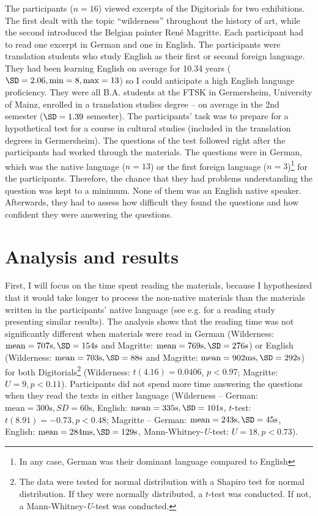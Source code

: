 \documentclass[output=paper]{langscibook}
\begin{document}
The participants ($n=16$) viewed excerpts of the Digitorials for two exhibitions. The first dealt with the topic “wilderness” throughout the history of art, while the second introduced the Belgian painter René Magritte. Each participant had to read one excerpt in German and one in English. The participants were translation students who study English as their first or second foreign language. They had been learning English on average for 10.34 years ($\SD= 2.06, \min= 8, \max= 13$) so I could anticipate a high English language proficiency. They were all B.A. students at the FTSK in Germersheim, University of Mainz, enrolled in a translation studies degree -- on average in the 2nd semester ($\SD= 1.39$ semester). The participants’ task was to prepare for a hypothetical test for a course in cultural studies (included in the translation degrees in Germersheim). The questions of the test followed right after the participants had worked through the materials. The questions were in German, which was the native language ($n=13$) or the first foreign language ($n= 3$)\footnote{In any case, German was their dominant language compared to English} for the participants. Therefore, the chance that they had problems understanding the question was kept to a minimum. None of them was an English native speaker. Afterwards, they had to assess how difficult they found the questions and how confident they were answering the questions.

\section{Analysis and results}

First, I will focus on the time spent reading the materials, because I hypothesized that it would take longer to process the non-native materials than the materials written in the participants' native language (see e.g. \citealt{cop_2015_eye} for a reading study presenting similar results). The analysis shows that the reading time was not significantly different when materials were read in German (Wilderness: $\text{mean}= 707\text{s}, \SD= 154\text{s}$ and Magritte: $\text{mean}= 769\text{s}, \SD= 276\text{s}$) or English (Wilderness: $\text{mean}= 703\text{s}, \SD= 88\text{s}$ and Magritte: $\text{mean} = 902\text{ms}, \SD= 292\text{s}$) for both Digitorials\footnote{The data were tested for normal distribution with a Shapiro test for normal distribution. If they were normally distributed, a $t$-test was conducted. If not, a Mann-Whitney-\textit{U}-test was conducted.} (Wilderness: $t(4.16)= 0.0406$, $p< 0.97$; Magritte: $U= 9, p< 0.11$). Participants did not spend more time answering the questions when they read the texts in either language (Wilderness -- German: $\text{mean}= 300\text{s}, SD= 60\text{s}$, English: $\text{mean}= 335\text{s}, \SD= 101\text{s}$, $t$-test: $t(8.91)= -0.73, p< 0.48$; Magritte -- German: $\text{mean}= 243\text{s}, \SD= 45\text{s}$, English: $\text{mean}= 284\text{ms}, \SD= 129\text{s}$, Mann-Whitney-\textit{U}-test: $U= 18, p< 0.73$). 
\end{document}
